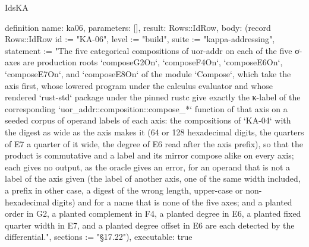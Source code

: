 \begin{lexlean}{IdsKA}
\begin{semanticmodule}
definition{
  name: ka06,
  parameters: [],
  result: Rows::IdRow,
  body: (record Rows::IdRow {id := "KA-06", level := "build", suite := "kappa-addressing", statement := "The five categorical compositions of uor-addr on each of the five σ-axes are production roots `composeG2On`, `composeF4On`, `composeE6On`, `composeE7On`, and `composeE8On` of the module `Compose`, which take the axis first, whose lowered program under the calculus evaluator and whose rendered `rust-std` package under the pinned rustc give exactly the κ-label of the corresponding `uor_addr::composition::compose_*` function of that axis on a seeded corpus of operand labels of each axis: the compositions of `KA-04` with the digest as wide as the axis makes it (64 or 128 hexadecimal digits, the quarters of E7 a quarter of it wide, the degree of E6 read after the axis prefix), so that the product is commutative and a label and its mirror compose alike on every axis; each gives no output, as the oracle gives an error, for an operand that is not a label of the axis given (the label of another axis, one of the same width included, a prefix in other case, a digest of the wrong length, upper-case or non-hexadecimal digits) and for a name that is none of the five axes; and a planted order in G2, a planted complement in F4, a planted degree in E6, a planted fixed quarter width in E7, and a planted degree offset in E6 are each detected by the differential.", sections := "§17.22"}),
  executable: true
}


\end{semanticmodule}
\end{lexlean}
